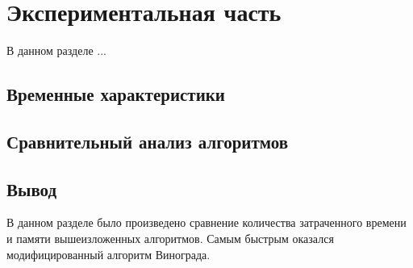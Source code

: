 \chapter{Экспериментальная часть}

В данном разделе ...

\section{Временные характеристики}

\section{Сравнительный анализ алгоритмов}

\section{Вывод}

В данном разделе было произведено сравнение количества затраченного вре­мени и памяти вышеизложенных алгоритмов.
Самым быстрым оказался модифицированный алгоритм Винограда.